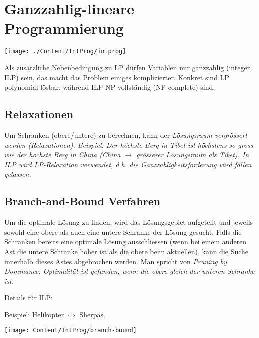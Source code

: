\section{Ganzzahlig-lineare Programmierung }
  \begin{minipage}{7cm}
    \texttt{[image: ./Content/IntProg/intprog]}
  \end{minipage}
  \begin{minipage}{12cm}
	  Als zusätzliche Nebenbedingung zu LP dürfen Variablen nur ganzzahlig (integer, ILP) sein, das macht das Problem einiges komplizierter.
	  Konkret sind LP polynomial lösbar, während ILP NP-vollständig (NP-complete) sind.
	    
  	\subsection{Relaxationen}
  		Um Schranken (obere/untere) zu berechnen, kann der \em Lösungsraum
  		vergrössert \em werden (Relaxationen). Beispiel: Der höchste Berg in
  		Tibet ist höchstens so gross wie der höchste Berg in China (China
  		$\rightarrow$ grösserer Lösungsraum als Tibet). In ILP wird \em
  		LP-Relaxation \em verwendet, d.h. die Ganzzahligkeitsforderung wird
  		fallen gelassen.
	\end{minipage}
  
		

\subsection{Branch-and-Bound Verfahren }
	\begin{minipage}{8cm}
		Um die optimale Lösung zu finden, wird das Lösungsgebiet aufgeteilt und jeweils sowohl eine obere als auch eine untere Schranke der Lösung gesucht. Falls die Schranken bereits eine optimale Lösung ausschliessen (wenn bei einem anderen Ast die untere Schranke höher ist als die obere beim aktuellen), kann die Suche innerhalb dieses Astes abgebrochen werden. Man spricht von \em Pruning by Dominance\em. Optimalität ist gefunden, wenn die obere gleich der unteren Schranke ist.
		
		Details für ILP: 
	\end{minipage}
	\begin{minipage}{10cm}
		Beispiel: Helikopter $\Leftrightarrow$ Sherpas.
		
		\texttt{[image: Content/IntProg/branch-bound]}
	\end{minipage}
  
